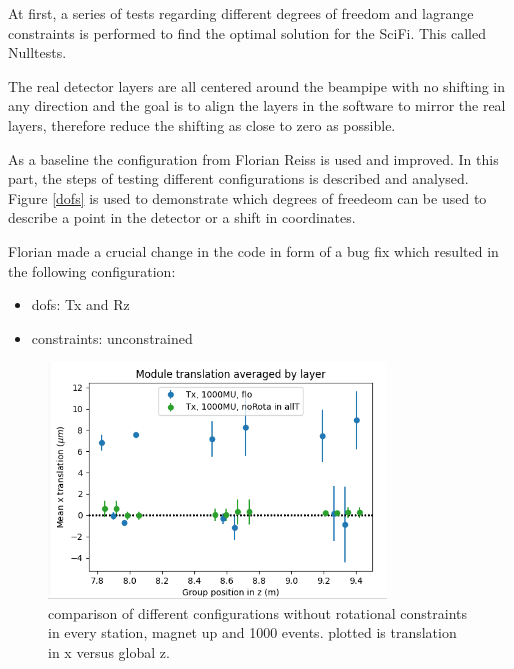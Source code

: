 

At first, a series of tests regarding different degrees of freedom and lagrange constraints is performed to find the optimal solution for the SciFi. This called Nulltests.

The real detector layers are all centered around the beampipe with no shifting in any direction and the goal is to align the layers in the software to mirror the real layers, therefore reduce the shifting as close to zero as possible.

As a baseline the configuration from Florian Reiss is used and improved.
In this part, the steps of testing different configurations is described and analysed.
Figure \ref{dofs} is used to demonstrate which degrees of freedeom can be used
to describe a point in the detector or a shift in coordinates.

Florian made a crucial change in the code in form of a bug fix which resulted
in the following configuration:
\begin{itemize}
  \item dofs: Tx and Rz
  \item constraints: unconstrained
\end{itemize}

\begin{figure}
  \centering
  \includegraphics[width=0.8\textwidth]{plots/june_21/Tx_noRota_allT_1000MU.png}
  \caption{comparison of different configurations without rotational constraints in every station, magnet up and 1000 events. plotted is translation in x versus global z.}
  \label{fig:june_2}
\end{figure}

